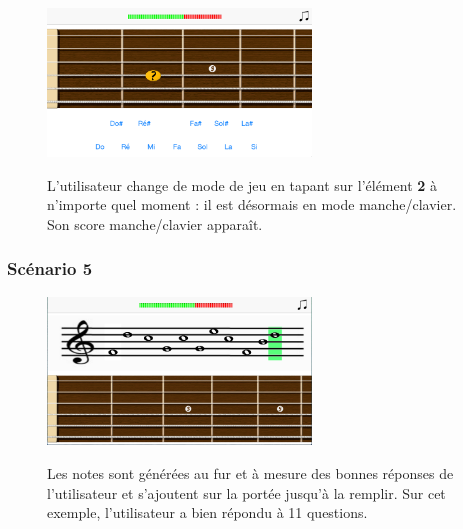 \documentclass{scrreprt}
\begin{document}
\begin{figure}[!ht]
  \begin{minipage}{0.55\linewidth}
    \includegraphics[width=7cm]{images/maquette_usecase/clavier/question.png}
  \end{minipage}\hfill
 \begin{minipage}{0.5\linewidth}
  {L'utilisateur change de mode de jeu en tapant sur l'élément \textbf{2} à n'importe quel moment : il est désormais en mode manche/clavier. Son score manche/clavier apparaît.}
   \end{minipage}
\end{figure}

\bigbreak

\newpage


\subsubsection{Scénario 5}
\bigbreak

\begin{figure}[!ht]
  \begin{minipage}{0.55\linewidth}
    \includegraphics[width=7cm]{images/maquette_usecase/portee/question_portee_remplie.png}
  \end{minipage}\hfill
 \begin{minipage}{0.5\linewidth}
  {Les notes sont générées au fur et à mesure des bonnes réponses de l'utilisateur et s'ajoutent sur la portée jusqu'à la remplir. Sur cet exemple, l'utilisateur a bien répondu à 11 questions.}
   \end{minipage}
\end{figure}
\end{document}
